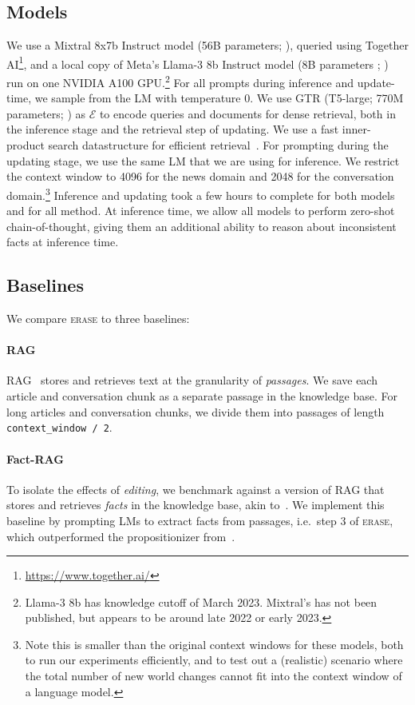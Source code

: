 \documentclass[11pt]{article}
\newcommand{\ourmethod}{\textsc{erase}\xspace}
\newcommand{\embed}{\mathcal{E}}
\begin{document}
\subsection{Models}
We use a Mixtral 8x7b Instruct model (56B parameters; \citealp{jiang2024mixtral}), queried using Together AI\footnote{\url{https://www.together.ai/}}, and a local copy of Meta's Llama-3 8b Instruct model (8B parameters ; \citealp{llama3modelcard}) run on one NVIDIA A100 GPU.\footnote{Llama-3 8b has knowledge cutoff of March 2023. Mixtral's has not been published, but appears to be around late 2022 or early 2023.} 
For all prompts during inference and update-time, we sample from the LM with temperature 0.
We use GTR (T5-large; 770M parameters; \citealp{ni-etal-2022-large}) as $\embed$ to encode queries and documents for dense retrieval, both in the inference stage and the retrieval step of updating. We use %
a fast inner-product search datastructure for efficient retrieval~\citep{FAISS}. 
For prompting during the updating stage, we use the same LM that we are using for inference.
We restrict the context window to 4096 for the news domain and 2048 for the conversation domain.\footnote{Note this is smaller than the original context windows for these models, both to run our experiments efficiently, and to test out a (realistic) scenario where the total number of new world changes cannot fit into the context window of a language model.}
Inference and updating took a few hours to complete for both models and for all method.
At inference time, we allow all models to perform zero-shot chain-of-thought, giving them an additional ability to reason about inconsistent facts at inference time. 

\subsection{Baselines}
We compare \ourmethod to three baselines:

\paragraph{RAG} RAG~\cite{RAG} stores and retrieves text at the granularity of \textit{passages}. We save each article and conversation chunk as a separate passage in the knowledge base. For long articles and conversation chunks, we divide them into passages of length \verb|context_window / 2|.

\paragraph{Fact-RAG} To isolate the effects of \textit{editing}, we benchmark against a version of RAG that stores and retrieves \textit{facts} in the knowledge base, akin to~\citet{chen2023dense}. 
We implement this baseline by prompting LMs to extract facts from passages, i.e.\ step 3 of \ourmethod, which 
outperformed the propositionizer from~\citet{chen2023dense}.
\end{document}
